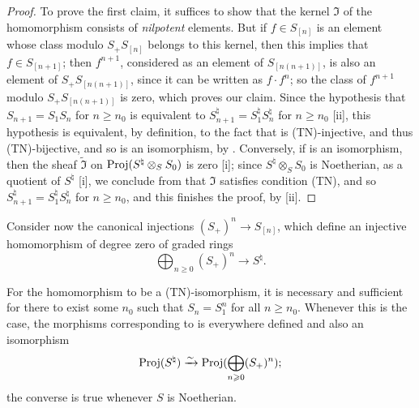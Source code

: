 \begin{proof}
To prove the first claim, it suffices  to show that the kernel $\mathfrak{I}$ of the homomorphism  consists of \emph{nilpotent} elements.
But if $f\in S_{[n]}$ is an element whose class modulo $S_+S_{[n]}$ belongs to this kernel, then this implies that $f\in S_{[n+1]}$;
then $f^{n+1}$, considered as an element of $S_{[n(n+1)]}$, is also an element of $S_+S_{[n(n+1)]}$, since it can be written as $f\cdot f^n$;
so the class of $f^{n+1}$ modulo $S_+S_{[n(n+1)]}$ is zero, which proves our claim.
Since the hypothesis that $S_{n+1}=S_1S_n$ for $n\geq n_0$ is equivalent to $S_{n+1}^\natural=S_1^\natural S_n^\natural$ for $n\geq n_0$ [ii], this hypothesis is equivalent, by definition, to the fact that  is (TN)-injective, and thus (TN)-bijective, and so  is an isomorphism, by .
Conversely, if  is an isomorphism, then the sheaf $\widetilde{\mathfrak{I}}$ on $\operatorname{Proj}(S^\natural\otimes_S S_0)$ is zero [i];
since $S^\natural\otimes_S S_0$ is Noetherian, as a quotient of $S^\natural$ [i], we conclude from  that $\mathfrak{I}$ satisfies condition (TN), and so $S_{n+1}^\natural=S_1^\natural S_n^\natural$ for $n\geq n_0$, and this finishes the proof, by [ii].
\end{proof}

\begin{env}[8.2.13]
\label{II.8.2.13}
Consider now the canonical injections $(S_+)^n\to S_{[n]}$, which define an injective homomorphism of degree zero of graded rings
\[
\label{II.8.2.13.1}
  \bigoplus_{n\geq0} (S_+)^n \to S^\natural.
\tag{8.2.13.1}
\]
\end{env}

\begin{proposition}[8.2.14]
\label{II.8.2.14}
For the homomorphism  to be a (TN)-isomorphism, it is necessary and sufficient for there to exist some $n_0$ such that $S_n=S_1^n$ for all $n\geq n_0$.
Whenever this is the case, the morphisms corresponding to  is everywhere defined and also an isomorphism
\[
  \operatorname{Proj}(S^\natural) \xrightarrow{\sim} \operatorname{Proj}(\bigoplus_{n\geqslant0}(S_+)^n);
\]
the converse is true whenever $S$ is Noetherian.
\end{proposition}

